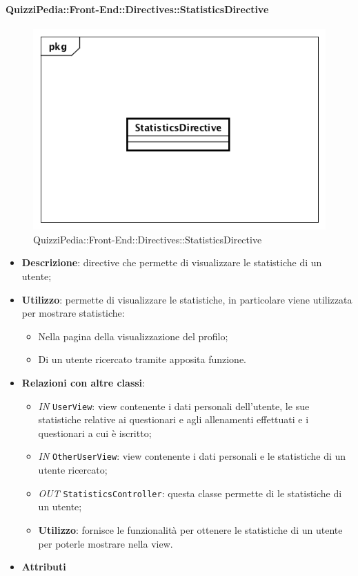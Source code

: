 \paragraph{QuizziPedia::Front-End::Directives::StatisticsDirective}

\label{QuizziPedia::Front-End::Directives::StatisticsDirective}

\begin{figure}[h]
	\centering
	\includegraphics[scale=0.5,keepaspectratio]{UML/Classi/Front-End/QuizziPedia_Front-end_Directives_StatisticsDirective.png}
	\caption{QuizziPedia::Front-End::Directives::StatisticsDirective}
\end{figure}

\begin{itemize}
	\item \textbf{Descrizione}: directive che permette di visualizzare le statistiche di un utente;
	\item \textbf{Utilizzo}: permette di visualizzare le statistiche, in particolare viene utilizzata per mostrare statistiche:
	\begin{itemize}
		\item Nella pagina della visualizzazione del profilo;
		\item Di un utente ricercato tramite apposita funzione.
	\end{itemize}
	\item \textbf{Relazioni con altre classi}:
	\begin{itemize}
		\item \textit{IN} \texttt{UserView}: view contenente i dati personali dell'utente, le sue statistiche relative ai questionari e agli allenamenti effettuati e i questionari a cui è iscritto;
		\item \textit{IN} \texttt{OtherUserView}: view contenente i dati personali e le statistiche di un utente ricercato;
		\item \textit{OUT} \texttt{StatisticsController}: questa classe permette di le statistiche di un utente;
		\item \textbf{Utilizzo}: fornisce le funzionalità per ottenere le statistiche di un utente per poterle mostrare nella view. 
	\end{itemize}
	\item \textbf{Attributi}
\end{itemize}

